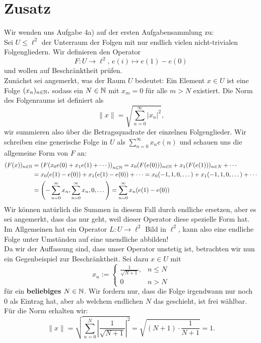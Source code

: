 \section{Zusatz}
\label{sec:01_08_25}

Wir wenden uns Aufgabe 4a) auf der ersten Aufgabensammlung zu:\\
Sei $U \leq \ell^2$ der Unterraum der Folgen mit nur endlich vielen nicht-trivialen Folgengliedern. Wir definieren den Operator \[F: U \to \ell^2, \, e(i) \mapsto e(1)-e(0)\] und wollen auf Beschränktheit prüfen.\\
Zunächst sei angemerkt, was der Raum $U$ bedeutet: Ein Element $x \in U$ ist eine Folge $(x_n)_{n \in \mathbb{N}},$ sodass ein $N \in \mathbb{N}$ mit $x_m = 0$ für alle $m > N$ existiert. Die Norm des Folgenraums ist definiert als
\[
\|x\| = \sqrt{\sum_{n=0}^\infty |x_n|^2},
\]
wir summieren also über die Betragsquadrate der einzelnen Folgenglieder. Wir schreiben eine generische Folge in $U$ als $\sum_{n=0}^\infty x_n e(n)$ und schauen uns die allgemeine Form von $F$ an:
\begin{align*}
(F(x))_{n \in \mathbb{N}} &= \left( F(x_0 e(0) + x_1 e(1) + \cdots) \right)_{n \in \mathbb{N}} = x_0 (F(e(0)))_{n \in \mathbb{N}} + x_1 (F(e(1)))_{n \in N} + \cdots \\
&= x_0 (e(1)-e(0)) + x_1 (e(1)-e(0)) + \cdots = x_0 (-1,1, 0, \dots) + x_1 (-1,1,0, \dots) + \cdots \\
&=\left(- \sum_{n=0}^\infty x_n,\sum_{n=0}^\infty x_n, 0, \dots \right) = \sum_{n=0}^\infty x_n (e(1)-e(0))
\end{align*}
Wir können natürlich die Summen in diesem Fall durch endliche ersetzen, aber es sei angemerkt, dass das nur geht, weil dieser Operator diese spezielle Form hat. Im Allgemeinen hat ein Operator $L: U \to \ell^2$ Bild in $\ell^2$, kann also eine endliche Folge unter Umständen auf eine unendliche abbilden!\\
Da wir der Auffassung sind, dass unser Operator unstetig ist, betrachten wir nun ein Gegenbeispiel zur Beschränktheit. Sei dazu $x \in U$ mit \[ x_n := \begin{cases} \frac{1}{\sqrt{N+1}}, &n \leq N\\ 0 &n > N\end{cases} \] für ein \textbf{beliebiges} $N \in \mathbb{N}$. Wir fordern nur, dass die Folge irgendwann nur noch $0$ als Eintrag hat, aber ab welchem endlichen $N$ das geschieht, ist frei wählbar. Für die Norm erhalten wir:
\[ \|x\| = \sqrt{\sum_{n=0}^N \left|\frac{1}{\sqrt{N+1}}\right|^2}  = \sqrt{(N+1) \cdot \frac{1}{N+1}} = 1.\]
